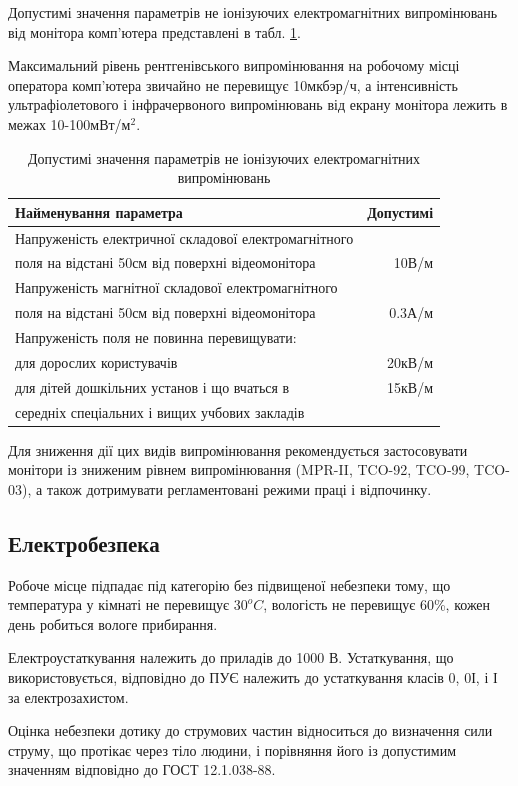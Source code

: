 Допустимі значення параметрів не іонізуючих електромагнітних випромінювань від монітора комп'ютера представлені в табл. \ref{tab:x-ray}.

Максимальний рівень рентгенівського випромінювання на робочому місці оператора комп'ютера звичайно не перевищує 10мкбэр/ч, а інтенсивність ультрафіолетового і інфрачервоного випромінювань від екрану монітора лежить в межах 10-100мВт/м$^2$.

\begin{table}[H]
	\centering
	\caption{Допустимі значення параметрів не іонізуючих електромагнітних випромінювань}
	\begin{tabular}{| l | r | }
		\hline
		Найменування параметра & Допустимі \\\hline
	    Напруженість електричної складової електромагнітного & \\
		поля на відстані 50см від поверхні відеомонітора & 10В/м \\\hline
	    Напруженість магнітної складової електромагнітного & \\
		поля на відстані 50см від поверхні відеомонітора & 0.3А/м \\\hline
		Напруженість поля не повинна перевищувати:  & \\
		для дорослих користувачів & 20кВ/м \\
		для дітей дошкільних установ і що вчаться в & 15кВ/м \\
		середніх спеціальних і вищих учбових закладів & \\\hline
	\end{tabular}
	\label{tab:x-ray}
\end{table}

Для зниження дії цих видів випромінювання рекомендується застосовувати монітори із зниженим рівнем випромінювання (MPR-II, TCO-92, TCO-99, TCO-03), а також дотримувати регламентовані режими праці і відпочинку.
\subsection{Електробезпека}
Робоче місце підпадає під категорію без підвищеної небезпеки тому, що температура у кімнаті не перевищує $30^oC$, вологість не перевищує 60\%, кожен день робиться вологе прибирання.

Електроустаткування належить до приладів до 1000 В. Устаткування, що використовується, відповідно до ПУЄ належить до устаткування класів 0, 0І, і І за електрозахистом.

Оцінка небезпеки дотику до струмових частин відноситься до визначення сили струму, що протікає через тіло людини, і порівняння його із допустимим значенням відповідно до ГОСТ 12.1.038-88.

